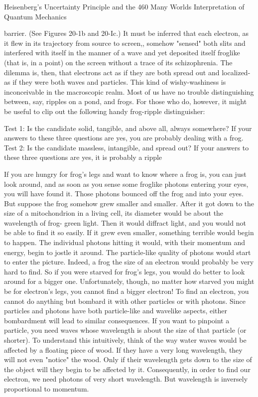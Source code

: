 Heisenberg's Uncertainty Principle and the                                            460
Many Worlds Interpretation of Quantum Mechanics

barrier. (See Figures 20-1b and 20-Ic.) It must be inferred that each electron, as it flew
in its trajectory from source to screen,, somehow "sensed" both slits and interfered
with itself in the manner of a wave and yet deposited itself froglike (that is, in a point)
on the screen without a trace of its schizophrenia.
         The dilemma is, then, that electrons act as if they are both spread out and
localized-as if they were both waves and particles. This kind of wishy-washiness is
inconceivable in the macroscopic realm. Most of us have no trouble distinguishing
between, say, ripples on a pond, and frogs. For those who do, however, it might be
useful to clip out the following handy frog-ripple distinguisher:

      Test 1: Is the candidate solid, tangible, and above all, always somewhere?
      If your answers to these three questions are yes, you are probably dealing
      with a frog.
      Test 2: Is the candidate massless, intangible, and spread out?
      If your answers to these three questions are yes, it is probably a ripple

       If you are hungry for frog's legs and want to know where a frog is, you can just
look around, and as soon as you sense some froglike photons entering your eyes, you
will have found it. Those photons bounced off the frog and into your eyes. But
suppose the frog somehow grew smaller and smaller. After it got down to the size of a
mitochondrion in a living cell, its diameter would be about the wavelength of frog-
green light. Then it would diffract light, and you would not be able to find it so easily.
If it grew even smaller, something terrible would begin to happen. The individual
photons hitting it would, with their momentum and energy, begin to jostle it around.
The particle-like quality of photons would start to enter the picture. Indeed, a frog the
size of an electron would probably be very hard to find. So if you were starved for
frog's legs, you would do better to look around for a bigger one.
Unfortunately, though, no matter how starved you might be for electron's legs, you
cannot find a bigger electron! To find an electron, you cannot do anything but
bombard it with other particles or with photons. Since particles and photons have both
particle-like and wavelike aspects, either bombardment will lead to similar
consequences. If you want to pinpoint a particle, you need waves whose wavelength
is about the size of that particle (or shorter). To understand this intuitively, think of
the way water waves would be affected by a floating piece of wood. If they have a
very long wavelength, they will not even "notice" the wood. Only if their wavelength
gets down to the size of the object will they begin to be affected by it.
Consequently, in order to find our electron, we need photons of very short
wavelength. But wavelength is inversely proportional to momentum.




